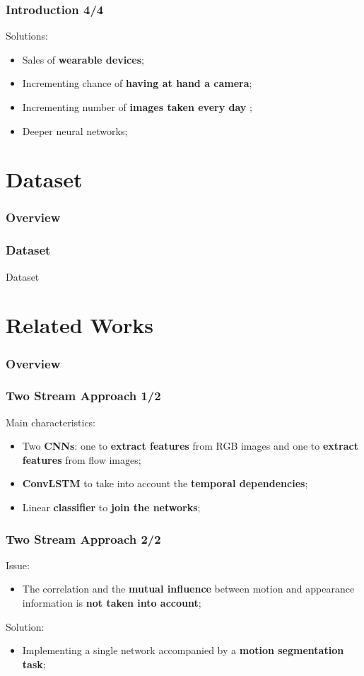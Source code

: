 \documentclass{beamer}
\begin{document}
\begin{frame}
\frametitle{Introduction 4/4}
Solutions:
\begin{itemize}
\item Sales of \textbf{wearable devices};
\item Incrementing chance of \textbf{having at hand a camera};
\item Incrementing number of \textbf{images taken every day} \cite{photos};
\item Deeper neural networks;
\end{itemize}
\end{frame}

\section{Dataset}

\begin{frame}
\frametitle{Overview} 
  \tableofcontents[currentsection]
\end{frame}

\begin{frame}
\frametitle{Dataset}
Dataset
\end{frame}
      
\section{Related Works}

\begin{frame}
\frametitle{Overview} 
  \tableofcontents[currentsection]
\end{frame}

\begin{frame}
\frametitle{Two Stream Approach 1/2}
Main characteristics:
\begin{itemize}
\item Two \textbf{CNNs}: one to \textbf{extract features} from RGB images and one to \textbf{extract features} from flow images;
\item \textbf{ConvLSTM} to take into account the \textbf{temporal dependencies};
\item Linear \textbf{classifier} to \textbf{join the networks};
\end{itemize}
\end{frame}

\begin{frame}
\frametitle{Two Stream Approach 2/2}
Issue:
\begin{itemize}
\item The correlation and the \textbf{mutual influence} between motion and appearance information is \textbf{not taken into account};
\end{itemize}
Solution:
\begin{itemize}
\item Implementing a single network accompanied by a \textbf{motion segmentation task};
\end{itemize}
\end{frame}
\end{document}
